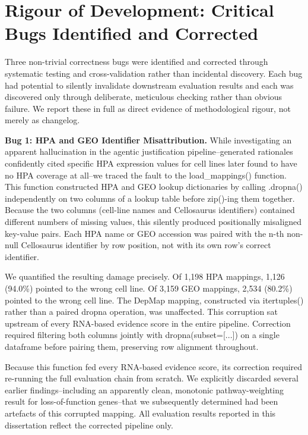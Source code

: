 \documentclass[author={Karen Coutinho, Ishaan Bhalla, Aman Raj, Dixit Kaloorani Malarmannan},
                supervisor={Dr. Daniel D'Andrea},
                degree={MSc},
                title={CellSelector Omics: A Multi-Omics Recommendation System for Cell Line Selection},
                subtitle={},
                type={},
                year={2026}]{dissertation}
\begin{document}
\section{Rigour of Development: Critical Bugs Identified and Corrected}

Three non-trivial correctness bugs were identified and corrected through systematic testing and cross-validation rather than incidental discovery. Each bug had potential to silently invalidate downstream evaluation results and each was discovered only through deliberate, meticulous checking rather than obvious failure. We report these in full as direct evidence of methodological rigour, not merely as changelog.

{\bf Bug 1: HPA and GEO Identifier Misattribution.} While investigating an apparent hallucination in the agentic justification pipeline--generated rationales confidently cited specific HPA expression values for cell lines later found to have no HPA coverage at all--we traced the fault to the load\_mappings() function. This function constructed HPA and GEO lookup dictionaries by calling .dropna() independently on two columns of a lookup table before zip()-ing them together. Because the two columns (cell-line names and Cellosaurus identifiers) contained different numbers of missing values, this silently produced positionally misaligned key-value pairs. Each HPA name or GEO accession was paired with the n-th non-null Cellosaurus identifier by row position, not with its own row's correct identifier.

We quantified the resulting damage precisely. Of 1,198 HPA mappings, 1,126 (94.0\%) pointed to the wrong cell line. Of 3,159 GEO mappings, 2,534 (80.2\%) pointed to the wrong cell line. The DepMap mapping, constructed via itertuples() rather than a paired dropna operation, was unaffected. This corruption sat upstream of every RNA-based evidence score in the entire pipeline. Correction required filtering both columns jointly with dropna(subset=[...]) on a single dataframe before pairing them, preserving row alignment throughout.

Because this function fed every RNA-based evidence score, its correction required re-running the full evaluation chain from scratch. We explicitly discarded several earlier findings--including an apparently clean, monotonic pathway-weighting result for loss-of-function genes--that we subsequently determined had been artefacts of this corrupted mapping. All evaluation results reported in this dissertation reflect the corrected pipeline only.
\end{document}
